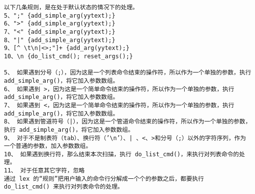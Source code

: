 \begin{lstlisting}
以下几条规则，是在处于默认状态的情况下的处理。 
5、";" {add_simple_arg(yytext);} 
6、">" {add_simple_arg(yytext);} 
7、"<" {add_simple_arg(yytext);} 
8、"|" {add_simple_arg(yytext);} 
9、[^ \t\n|<>;"]+ {add_arg(yytext);} 
10、\n {do_list_cmd(); reset_args();} 

5、 如果遇到分号（;），因为这是一个列表命令结束的操作符，所以作为一个单独的参数，执行 add_simple_arg()，将它加入参数数组。 
6、 如果遇到 >，因为这是一个简单命令结束的操作符，所以作为一个单独的参数，执行 add_simple_arg()，将它加入参数数组。 
7、 如果遇到 <，因为这是一个简单命令结束的操作符，所以作为一个单独的参数，执行 add_simple_arg()，将它加入参数数组。 
8、 如果遇到管道符号（|），因为这是一个管道命令结束的操作符，所以作为一个单独的参数，执行 add_simple_arg()，将它加入参数数组。 
9、 对于不是制表符（tab）、换行符（’\n’）、| 、<、>和分号（;）以外的字符序列，作为一个普通的参数，加入参数数组。 
10、 如果遇到换行符，那么结束本次扫描，执行 do_list_cmd()，来执行对列表命令的处理。 
11、 对于任意其它字符，忽略 
通过 lex 的“规则”把用户输入的命令行分解成一个个的参数之后，都要执行 do_list_cmd() 来执行对列表命令的处理。 



\end{lstlisting}
